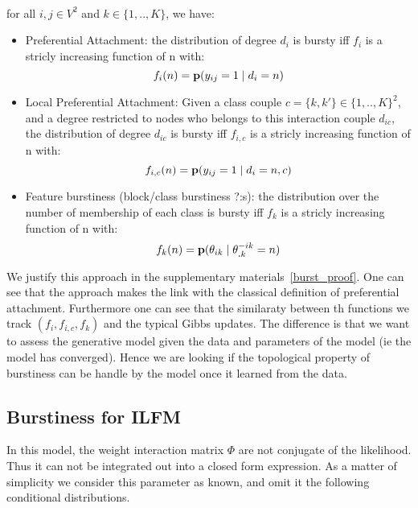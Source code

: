 \begin{proposition}~\\
for all $i,j \in V^2$ and $k \in \{1,.., K\}$, we have:
\begin{itemize}
	\item Preferential Attachment: the distribution of degree $d_i$ is bursty iff $f_i$ is a stricly increasing function of n with: $$f_i(n)=\mathbf{p}(y_{ij}=1 \mid d_i=n)$$
	\item Local Preferential Attachment: Given a class couple $c= \{k, k'\} \in \{1,..,K\}^2$, and a degree restricted to nodes who belongs to this interaction couple $d_{ic}$, the distribution of degree $d_{ic}$ is bursty iff $f_{i,c}$ is a stricly increasing function of n with: $$f_{i,c}(n)=\mathbf{p}(y_{ij}=1 \mid d_i=n, c)$$
	\item Feature burstiness (block/class burstiness ?:s): the distribution over the number of membership of each class is bursty iff  $f_k$  is a stricly increasing function of n with: $$f_k(n) = \mathbf{p}(\theta_{ik} \mid \theta_{\bm{.}k}^{-ik}=n)$$ 
\end{itemize}
\end{proposition}

We justify this approach in the supplementary materials~\ref{burst_proof}. One can see that the approach makes the link with the classical definition of preferential attachment. Furthermore one can see that the similaraty between th functions we track $(f_i, f_{i,c}, f_k)$ and the typical Gibbs updates. The difference is that we want to assess the generative model given the data and parameters of the model (ie the model has converged). Hence we are looking if the topological property of burstiness can be handle by the model once it learned from the data.~\\



\subsection{Burstiness for ILFM}

In this model, the weight interaction matrix $\Phi$ are not conjugate of the likelihood. Thus it can not be integrated out into a closed form expression. As a matter of simplicity we consider this parameter as known, and omit it the following conditional distributions.

